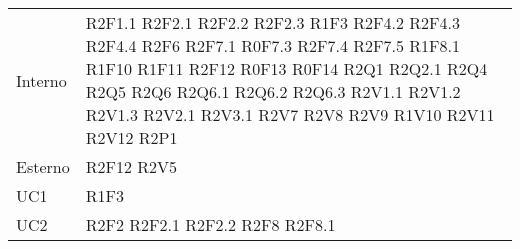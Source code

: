 \begin{center}
\begin{longtable}{  p{5cm} p{5cm} }
		Interno & R2F1.1 \newline R2F2.1 \newline R2F2.2 \newline R2F2.3 \newline R1F3 \newline R2F4.2 \newline R2F4.3 \newline R2F4.4 \newline R2F6 \newline R2F7.1 \newline R0F7.3 \newline R2F7.4 \newline R2F7.5 \newline R1F8.1 \newline R1F10 \newline R1F11 \newline R2F12 \newline R0F13 \newline R0F14 \newline R2Q1 \newline R2Q2.1 \newline R2Q4 \newline R2Q5 \newline R2Q6 \newline R2Q6.1 \newline R2Q6.2 \newline R2Q6.3 \newline R2V1.1 \newline R2V1.2 \newline R2V1.3 \newline R2V2.1 \newline R2V3.1 \newline R2V7 \newline R2V8 \newline R2V9 \newline R1V10 \newline R2V11 \newline R2V12 \newline R2P1 \\
		Esterno	& R2F12 \newline R2V5 \\
		UC1 & R1F3 \\
		UC2 & R2F2 \newline R2F2.1 \newline R2F2.2 \newline R2F8 \newline R2F8.1 \\

\end{longtable}
\end{center}
